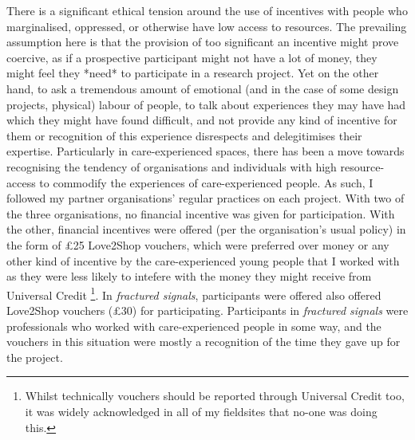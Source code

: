 There is a significant ethical tension around the use of incentives with people who marginalised, oppressed, or otherwise have low access to resources. The prevailing assumption here is that the provision of too significant an incentive might prove coercive, as if a prospective participant might not have a lot of money, they might feel they *need* to participate in a research project. Yet on the other hand, to ask a tremendous amount of emotional (and in the case of some design projects, physical) labour of people, to talk about experiences they may have had which they might have found difficult, and not provide any kind of incentive for them or recognition of this experience disrespects and delegitimises their expertise. Particularly in care-experienced spaces, there has been a move towards recognising the tendency of organisations and individuals with high resource-access to commodify the experiences of care-experienced people. As such, I followed my partner organisations’ regular practices on each project. With two of the three organisations, no financial incentive was given for participation. With the other, financial incentives were offered (per the organisation's usual policy) in the form of £25 Love2Shop vouchers, which were preferred over money or any other kind of incentive by the care-experienced young people that I worked with as they were less likely to intefere with the money they might receive from Universal Credit \footnote{Whilst technically vouchers should be reported through Universal Credit too, it was widely acknowledged in all of my fieldsites that no-one was doing this.}. In \emph{fractured signals}, participants were offered also offered Love2Shop vouchers (£30) for participating. Participants in \emph{fractured signals} were professionals who worked with care-experienced people in some way, and the vouchers in this situation were mostly a recognition of the time they gave up for the project. 

